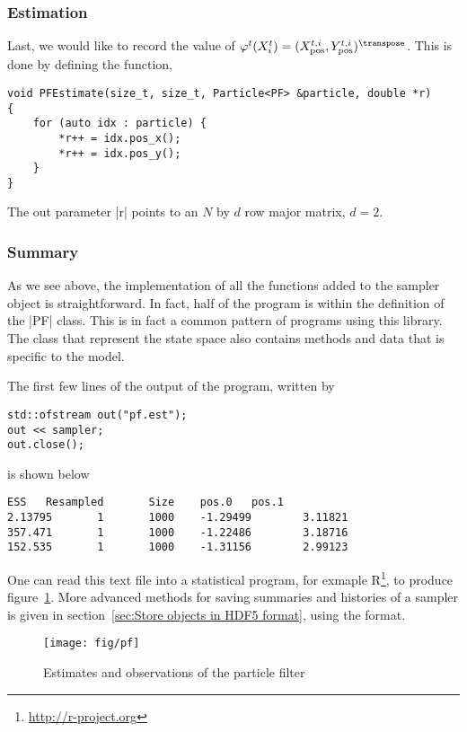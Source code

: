 \subsubsection{Estimation}

Last, we would like to record the value of $\varphi^t(X_i^t) =
(\xpos^{t,i},\ypos^{t,i})^{\transpose}$. This is done by defining the function,
\begin{verbatim}
void PFEstimate(size_t, size_t, Particle<PF> &particle, double *r)
{
    for (auto idx : particle) {
        *r++ = idx.pos_x();
        *r++ = idx.pos_y();
    }
}
\end{verbatim}
The out parameter |r| points to an $N$ by $d$ row major matrix, $d = 2$.

\subsubsection{Summary}

As we see above, the implementation of all the functions added to the sampler
object is straightforward. In fact, half of the program is within the
definition of the |PF| class. This is in fact a common pattern of programs
using this library. The class that represent the state space also contains
methods and data that is specific to the model.

The first few lines of the output of the program, written by
\begin{verbatim}
std::ofstream out("pf.est");
out << sampler;
out.close();
\end{verbatim}
is shown below
\begin{verbatim}
ESS   Resampled       Size    pos.0   pos.1
2.13795       1       1000    -1.29499        3.11821
357.471       1       1000    -1.22486        3.18716
152.535       1       1000    -1.31156        2.99123
\end{verbatim}
One can read this text file into a statistical program, for exmaple
R\footnote{\url{http://r-project.org}}, to produce figure~\ref{fig:pf}. More
advanced methods for saving summaries and histories of a sampler is given in
section~\ref{sec:Store objects in HDF5 format}, using the \hdf format.

\begin{figure}
  \texttt{[image: fig/pf]}
  \caption{Estimates and observations of the particle filter}
  \label{fig:pf}
\end{figure}
